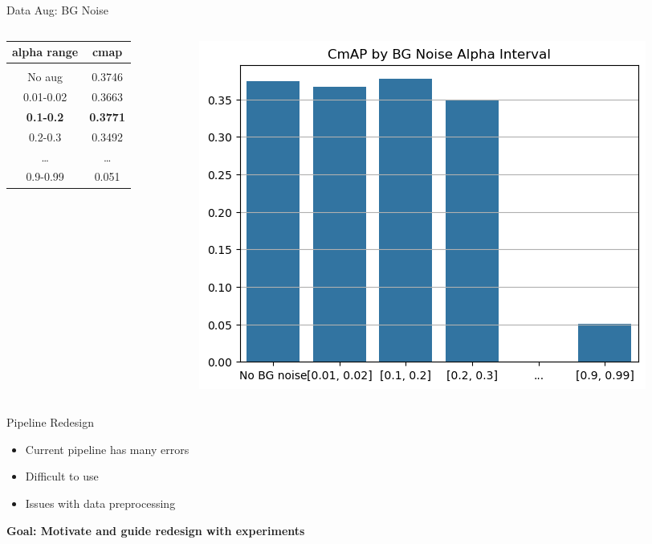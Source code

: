 \begin{frame}{Data Aug: BG Noise}
    \begin{columns}
        \begin{column}{0.5\textwidth}
            \centering
            \begin{tabular}{c|c}
                alpha range & cmap \\
                \hline \\
                No aug & 0.3746 \\
                0.01-0.02 & 0.3663 \\
            \textbf{0.1-0.2} & \textbf{0.3771} \\
                0.2-0.3 & 0.3492 \\
                \dots & \dots \\
                0.9-0.99 & 0.051
            \end{tabular}
        \end{column}
        \begin{column}{0.5\textwidth}
            \includegraphics[width=\textwidth]{images/cmap_by_bgnoise.png}
        \end{column}
    \end{columns}
\end{frame}

\begin{frame}{Pipeline Redesign}
    \begin{itemize}
        \item Current pipeline has many errors
        \item Difficult to use
        \item Issues with data preprocessing
    \end{itemize}
    \begin{center}
        \textbf{Goal: Motivate and guide redesign with experiments}
    \end{center}
\end{frame}